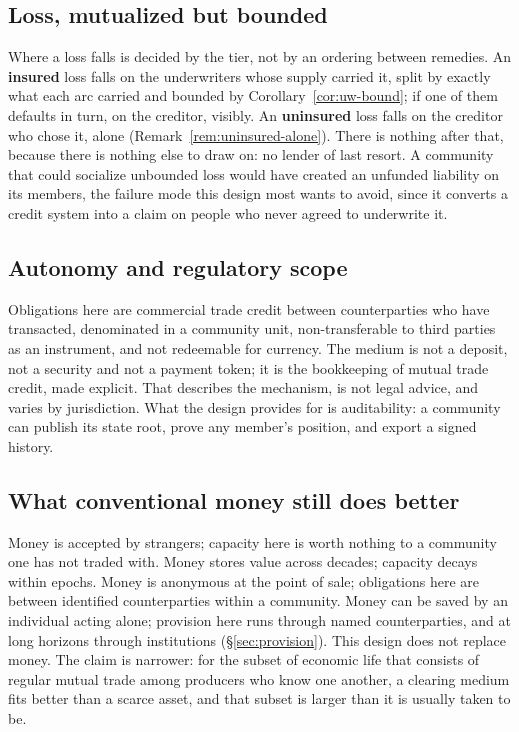 \subsection{Loss, mutualized but bounded}

Where a loss falls is decided by the tier, not by an ordering between remedies. An
\textbf{insured} loss falls on the underwriters whose supply carried it, split by exactly
what each arc carried and bounded by Corollary~\ref{cor:uw-bound}; if one of them defaults
in turn, on the creditor, visibly. An \textbf{uninsured} loss falls on the creditor who
chose it, alone (Remark~\ref{rem:uninsured-alone}). There is nothing after that, because
there is nothing else to draw on: no lender of last resort. A community that could
socialize unbounded loss would have created an unfunded liability on its members, the
failure mode this design most wants to avoid, since it converts a credit system into a
claim on people who never agreed to underwrite it.

\subsection{Autonomy and regulatory scope}

Obligations here are commercial trade credit between counterparties who have transacted,
denominated in a community unit, non-transferable to third parties as an instrument, and
not redeemable for currency. The medium is not a deposit, not a security and not a payment
token; it is the bookkeeping of mutual trade credit, made explicit. That describes the
mechanism, is not legal advice, and varies by jurisdiction. What the design provides for is
auditability: a community can publish its state root, prove any member's position, and
export a signed history.

\subsection{What conventional money still does better}

Money is accepted by strangers; capacity here is worth nothing to a community one has not
traded with. Money stores value across decades; capacity decays within epochs. Money is
anonymous at the point of sale; obligations here are between identified counterparties
within a community. Money can be saved by an individual acting alone; provision here runs
through named counterparties, and at long horizons through institutions
(\S\ref{sec:provision}). This design does not replace money. The claim is narrower: for
the subset of economic life that consists of regular mutual trade among producers who know
one another, a clearing medium fits better than a scarce asset, and that subset is larger
than it is usually taken to be.
